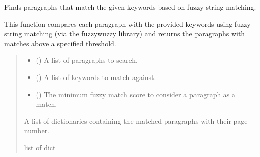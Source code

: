 \documentclass[letterpaper,10pt,english]{sphinxmanual}
\begin{document}
\begin{fulllineitems}
\label{\detokenize{modules.data_storage:modules.data_storage.retry_failed_reports.find_matching_paragraphs}}
\pysigstartsignatures
\pysiglinewithargsret
{}
{\sphinxparamcomma {}\sphinxparamcomma {}}
{}
\pysigstopsignatures
\sphinxAtStartPar
Finds paragraphs that match the given keywords based on fuzzy string matching.

\sphinxAtStartPar
This function compares each paragraph with the provided keywords using fuzzy
string matching (via the fuzzywuzzy library) and returns the paragraphs with
matches above a specified threshold.
\begin{quote}\begin{description}
\begin{itemize}
\item {} 
\sphinxAtStartPar
{} (\sphinxstyleliteralemphasis{\sphinxupquote{ (}}\sphinxstyleliteralemphasis{\sphinxupquote{, }}\sphinxstyleliteralemphasis{\sphinxupquote{)}}) \textendash{} A list of paragraphs to search.

\item {} 
\sphinxAtStartPar
{} () \textendash{} A list of keywords to match against.

\item {} 
\sphinxAtStartPar
{} () \textendash{} The minimum fuzzy match score to consider a paragraph as a match.

\end{itemize}

\sphinxAtStartPar
A list of dictionaries containing the matched paragraphs with their page number.

\sphinxAtStartPar
list of dict

\end{description}\end{quote}

\end{fulllineitems}
\end{document}
